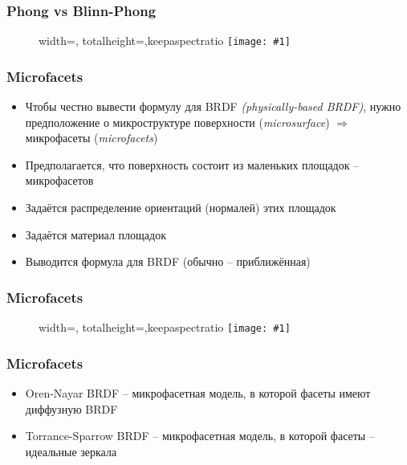 \documentclass[10pt]{beamer}
\newcommand{\slideimage}[1]{
  \begin{figure}
    \begin{adjustbox}{width=\textwidth, totalheight=\textheight-2\baselineskip-2\baselineskip,keepaspectratio}
      \texttt{[image: \#1]}
    \end{adjustbox}
  \end{figure}
}
\begin{document}
\begin{frame}[fragile]
\frametitle{Phong vs Blinn-Phong}
\slideimage{blinn-phong.png}
\end{frame}

\begin{frame}[fragile]
\frametitle{Microfacets}
\begin{itemize}
\item Чтобы честно вывести формулу для BRDF \textit{(physically-based BRDF)}, нужно предположение о микроструктуре поверхности (\textit{microsurface}) \pause \begin{math}\Rightarrow\end{math} микрофасеты (\textit{microfacets})
\pause
\item Предполагается, что поверхность состоит из маленьких площадок -- микрофасетов
\pause
\item Задаётся распределение ориентаций (нормалей) этих площадок
\pause
\item Задаётся материал площадок
\pause
\item Выводится формула для BRDF (обычно -- приближённая)
\end{itemize}
\end{frame}

\begin{frame}[fragile]
\frametitle{Microfacets}
\slideimage{microfacet.png}
\end{frame}

\begin{frame}[fragile]
\frametitle{Microfacets}
\begin{itemize}
\item Oren-Nayar BRDF -- микрофасетная модель, в которой фасеты имеют диффузную BRDF
\item Torrance-Sparrow BRDF -- микрофасетная модель, в которой фасеты -- идеальные зеркала
\end{itemize}
\end{frame}
\end{document}

